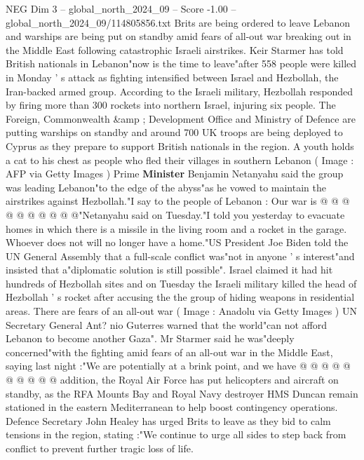 \begin{textsample}{NEG Dim 3 – global\_north\_2024\_09 – Score -1.00 – global\_north\_2024\_09/114805856.txt}  \label{ex:f3_neg_295}
Brits are being ordered to leave Lebanon and warships are being put on standby amid fears of all-out war breaking out in the Middle East following catastrophic Israeli airstrikes.
Keir Starmer has told British nationals in Lebanon"now is the time to leave"after 558 people were killed in Monday ' s attack as fighting intensified between Israel and Hezbollah, the Iran-backed armed group.
According to the Israeli military, Hezbollah responded by firing more than 300 rockets into northern Israel, injuring six people.
The Foreign, Commonwealth \&amp ; Development Office and Ministry of Defence are putting warships on standby and around 700 UK troops are being deployed to Cyprus as they prepare to support British nationals in the region.
A youth holds a cat to his chest as people who fled their villages in southern Lebanon ( Image : AFP via Getty Images ) Prime \textbf{Minister} Benjamin Netanyahu said the group was leading Lebanon"to the edge of the abyss"as he vowed to maintain the airstrikes against Hezbollah."I say to the people of Lebanon : Our war is @ @ @ @ @ @ @ @ @ @"Netanyahu said on Tuesday."I told you yesterday to evacuate homes in which there is a missile in the living room and a rocket in the garage.
Whoever does not will no longer have a home."US President Joe Biden told the UN General Assembly that a full-scale conflict was"not in anyone ' s interest"and insisted that a"diplomatic solution is still possible".
Israel claimed it had hit hundreds of Hezbollah sites and on Tuesday the Israeli military killed the head of Hezbollah ' s rocket after accusing the the group of hiding weapons in residential areas.
There are fears of an all-out war ( Image : Anadolu via Getty Images ) UN Secretary General Ant? nio Guterres warned that the world"can not afford Lebanon to become another Gaza".
Mr Starmer said he was"deeply concerned"with the fighting amid fears of an all-out war in the Middle East, saying last night :"We are potentially at a brink point, and we have @ @ @ @ @ @ @ @ @ @ addition, the Royal Air Force has put helicopters and aircraft on standby, as the RFA Mounts Bay and Royal Navy destroyer HMS Duncan remain stationed in the eastern Mediterranean to help boost contingency operations.
Defence Secretary John Healey has urged Brits to leave as they bid to calm tensions in the region, stating :"We continue to urge all sides to step back from conflict to prevent further tragic loss of life.

\end{textsample}
